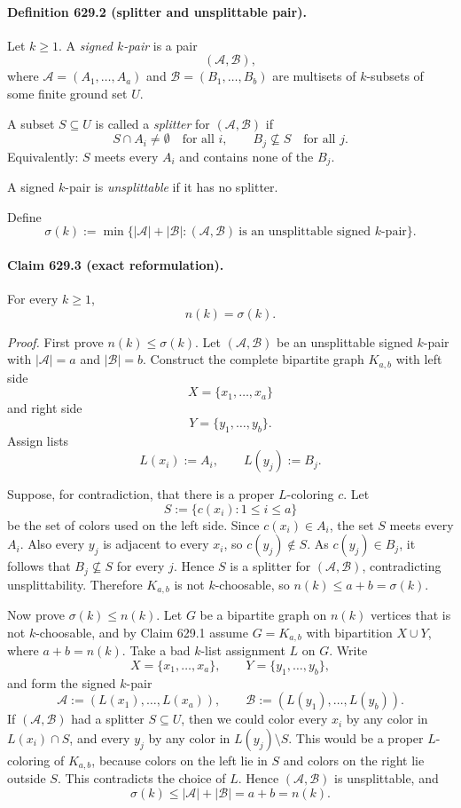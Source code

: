 \paragraph{Definition 629.2 (splitter and unsplittable pair).}
Let \(k\ge 1\). A \emph{signed \(k\)-pair} is a pair
\[
(\mathcal A,\mathcal B),
\]
where \(\mathcal A=(A_1,\dots,A_a)\) and \(\mathcal B=(B_1,\dots,B_b)\) are multisets of \(k\)-subsets of some finite ground set \(U\).

A subset \(S\subseteq U\) is called a \emph{splitter} for \((\mathcal A,\mathcal B)\) if
\[
S\cap A_i\neq \emptyset \quad\text{for all }i,
\qquad
B_j\nsubseteq S \quad\text{for all }j.
\]
Equivalently: \(S\) meets every \(A_i\) and contains none of the \(B_j\).

A signed \(k\)-pair is \emph{unsplittable} if it has no splitter.

Define
\[
\sigma(k):=\min\{|\mathcal A|+|\mathcal B|:(\mathcal A,\mathcal B)\ \text{is an unsplittable signed \(k\)-pair}\}.
\]

\paragraph{Claim 629.3 (exact reformulation).}
For every \(k\ge 1\),
\[
n(k)=\sigma(k).
\]

\emph{Proof.}
First prove \(n(k)\le \sigma(k)\).
Let \((\mathcal A,\mathcal B)\) be an unsplittable signed \(k\)-pair with
\(|\mathcal A|=a\) and \(|\mathcal B|=b\).
Construct the complete bipartite graph \(K_{a,b}\) with left side
\[
X=\{x_1,\dots,x_a\}
\]
and right side
\[
Y=\{y_1,\dots,y_b\}.
\]
Assign lists
\[
L(x_i):=A_i,\qquad L(y_j):=B_j.
\]

Suppose, for contradiction, that there is a proper \(L\)-coloring \(c\).
Let
\[
S:=\{c(x_i):1\le i\le a\}
\]
be the set of colors used on the left side.
Since \(c(x_i)\in A_i\), the set \(S\) meets every \(A_i\).
Also every \(y_j\) is adjacent to every \(x_i\), so \(c(y_j)\notin S\). As \(c(y_j)\in B_j\), it follows that \(B_j\nsubseteq S\) for every \(j\).
Hence \(S\) is a splitter for \((\mathcal A,\mathcal B)\), contradicting unsplittability.
Therefore \(K_{a,b}\) is not \(k\)-choosable, so \(n(k)\le a+b=\sigma(k)\).

Now prove \(\sigma(k)\le n(k)\).
Let \(G\) be a bipartite graph on \(n(k)\) vertices that is not \(k\)-choosable, and by Claim 629.1 assume \(G=K_{a,b}\) with bipartition \(X\cup Y\), where \(a+b=n(k)\).
Take a bad \(k\)-list assignment \(L\) on \(G\).
Write
\[
X=\{x_1,\dots,x_a\},\qquad Y=\{y_1,\dots,y_b\},
\]
and form the signed \(k\)-pair
\[
\mathcal A:=(L(x_1),\dots,L(x_a)),\qquad
\mathcal B:=(L(y_1),\dots,L(y_b)).
\]
If \((\mathcal A,\mathcal B)\) had a splitter \(S\subseteq U\), then we could color every \(x_i\) by any color in \(L(x_i)\cap S\), and every \(y_j\) by any color in \(L(y_j)\setminus S\).
This would be a proper \(L\)-coloring of \(K_{a,b}\), because colors on the left lie in \(S\) and colors on the right lie outside \(S\).
This contradicts the choice of \(L\).
Hence \((\mathcal A,\mathcal B)\) is unsplittable, and
\[
\sigma(k)\le |\mathcal A|+|\mathcal B|=a+b=n(k).
\]

